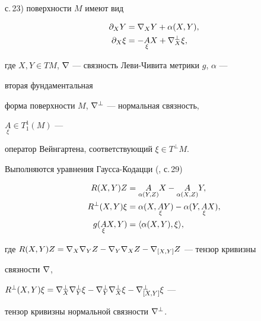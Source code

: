 с.\,23) поверхности $M$ имеют вид 


\begin{equation} 


\begin{split} 


\partial_XY&=\na_XY+\alpha(X,Y),\\ 


\partial_X\xi&=-\underset{\xi}{A}{}X+\na_X^\bot\xi, 


\end{split} 


\end{equation} 


где $X,Y\in TM$, $\nabla$ --- связность Леви-Чивита метрики $g$, $\alpha$ --- 


вторая фундаментальная 


форма поверхности $M$, $\nabla^\bot$ --- нормальная связность, 


$\underset{\xi}{A}{}\in T^1_1(M)$ --- 


оператор Вейнгартена, соответствующий $\xi\in T^\bot M$. 


 


Выполняются уравнения Гаусса-Кодацци (\cite{Kob}, с.\,29) 


\begin{equation} 


\begin{split} 


R(X,Y)Z&=\underset{\alpha(Y,Z)}{A}{}X-\underset{\alpha(X,Z)}{A}{}Y,\\ 


R^\bot(X,Y)\xi&=\alpha(X,\underset{\xi}{A}{}Y)- 


\alpha(Y,\underset{\xi}{A}{}X),\\ 


g(\underset{\xi}{A}{}X,Y)&=\la\alpha(X,Y),\xi\ra, 


\end{split} 


\end{equation} 


где $R(X,Y)Z=\nabla_X\nabla_YZ-\nabla_Y\nabla_XZ-\nabla_{[X,Y]}Z$ --- тензор кривизны 


связности $\nabla$, 


$R^\bot(X,Y)\xi=\na_X^\bot\na_Y^\bot\xi-\na_Y^\bot\na_X^\bot\xi- 


\na^\bot_{[X,Y]}\xi$ --- 


тензор кривизны нормальной связности $\nabla^\bot$. 


